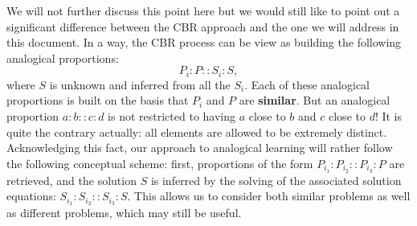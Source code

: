 We will not further discuss this point here but we would still like to point out a
significant difference between the CBR approach and the one we will address in
this document. In a way, the CBR process can be view as building the following
analogical proportions:
$$P_i:P :: S_i : S, $$
where $S$ is unknown and inferred from all the $S_i$. Each of these analogical
proportions is built on the basis that $P_i$ and $P$ are \textbf{similar}. But
an analogical proportion $a:b::c:d$ is not restricted to having $a$ close to
$b$ and $c$ close to $d$! It is quite the contrary actually: all elements are
allowed to be extremely distinct. Acknowledging this fact, our approach to
analogical learning will rather follow the following conceptual scheme: first,
proportions of the form $P_{i_1} : P_{i_2} :: P_{i_3} : P$ are retrieved, and
the solution $S$ is inferred by the solving of the associated solution
equations: $S_{i_1} : S_{i_2} :: S_{i_3} : S$. This allows us to consider both
similar problems as well as different problems, which may still be useful.
